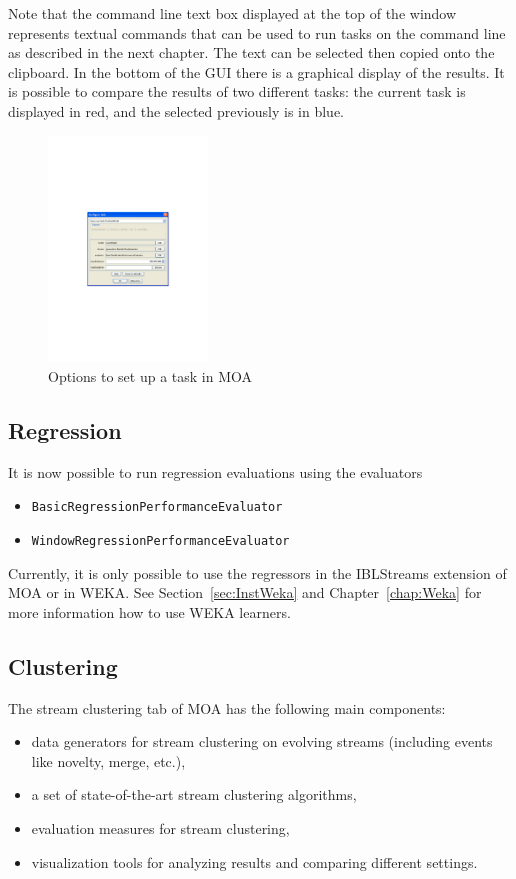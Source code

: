 \documentclass[a4paper,12pt,twoside]{book}
\begin{document}
Note that the command line text box displayed at the top of the window represents textual commands that can be used to run tasks on the command line as described in the next chapter.
The text can be selected then copied onto the clipboard. 
In the bottom of the GUI there is a graphical display of the results. It is possible
to compare the results of two different tasks: the current task is displayed in red, and the selected previously is in blue. 

\begin{figure}[t]
\begin{center}
\includegraphics[height=6cm]{figures/Configure_Task}\end{center}
\caption{Options to set up a task in MOA}
\end{figure}

\subsection{Regression}

It is now possible to run regression evaluations using the evaluators
\begin{itemize}
\item {\tt BasicRegressionPerformanceEvaluator}  
\item {\tt WindowRegressionPerformanceEvaluator}
\end{itemize}
Currently, it is only possible to use the regressors in the IBLStreams extension of MOA or in WEKA.
See Section~\ref{sec:InstWeka} and Chapter~\ref{chap:Weka} for more information how to use WEKA learners. 


\subsection{Clustering}

The stream clustering tab of MOA has the following main components:
\begin{itemize}
	\item data generators for stream clustering on evolving streams (including events like novelty, merge, etc.),
	\item a set of state-of-the-art stream clustering algorithms,
	\item evaluation measures for stream clustering,
	\item visualization tools for analyzing results and comparing different settings.
\end{itemize}
\end{document}
